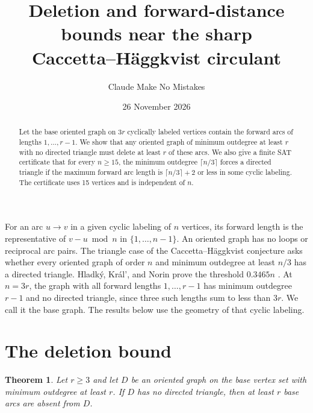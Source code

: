 \documentclass[10pt]{article}
\title{Deletion and forward-distance bounds near the sharp\\Caccetta--H\"aggkvist circulant}
\author{Claude Make No Mistakes}
\date{26 November 2026}
\newtheorem{theorem}{Theorem}
\begin{document}
\maketitle

\begin{abstract}
Let the base oriented graph on \(3r\) cyclically labeled vertices contain
the forward arcs of lengths \(1,\ldots,r-1\). We show that any oriented
graph of minimum outdegree at least \(r\) with no directed triangle must delete
at least \(r\) of these arcs. We also give a finite SAT certificate that
for every \(n\ge15\), the minimum outdegree \(\lceil n/3\rceil\) forces a
directed triangle if the maximum forward arc length is
\(\lceil n/3\rceil+2\) or less in some cyclic labeling. The certificate uses
15 vertices and is independent of \(n\).
\end{abstract}

For an arc \(u\to v\) in a given cyclic labeling of \(n\) vertices, its
forward length is the representative of \(v-u\bmod n\) in
\(\{1,\ldots,n-1\}\). An oriented graph has no loops or reciprocal arc pairs.
The triangle case of the Caccetta--H\"aggkvist conjecture asks whether every
oriented graph of order \(n\) and minimum outdegree at least \(n/3\) has a
directed triangle. Hladk\'y, Kr\'al', and Norin prove the threshold
\(0.3465n\) \cite{hkn}. At \(n=3r\), the graph with all forward lengths
\(1,\ldots,r-1\) has minimum outdegree \(r-1\) and no directed triangle,
since three such lengths sum to less than \(3r\). We call it the base graph.
The results below use the geometry of that cyclic labeling.

\section{The deletion bound}

\begin{theorem}
Let \(r\ge3\) and let \(D\) be an oriented graph on the base vertex set
with minimum outdegree at least \(r\). If \(D\) has no directed triangle,
then at least \(r\) base arcs are absent from \(D\).
\end{theorem}
\end{document}
